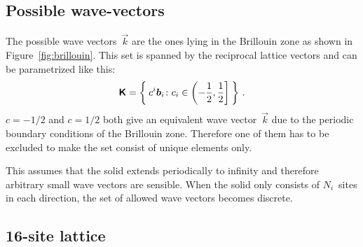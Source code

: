 \documentclass[11pt, english, fleqn, DIV=15, headinclude, BCOR=1cm]{scrartcl}
\begin{document}
\subsection{Possible wave-vectors}

\newcommand{\setK}{\text{\bfseries\sffamily K}}

The possible wave vectors~$\vec k$ are the ones lying in the Brillouin zone as
shown in Figure~\ref{fig:brillouin}. This set is spanned by the reciprocal
lattice vectors and can be parametrized like this:
\[
    \setK = \Set{c^i \vec b_i \colon c_i \in \left(- \frac12 , \frac12 \right]}
    \,.
\]
$c = - 1/2$ and $c = 1/2$ both give an equivalent wave vector~$\vec k$ due to
the periodic boundary conditions of the Brillouin zone. Therefore one of them
has to be excluded to make the set consist of unique elements only.

This assumes that the solid extends periodically to infinity and therefore
arbitrary small wave vectors are sensible. When the solid only consists of
$N_i$~sites in each direction, the set of allowed wave vectors becomes
discrete.

\subsection{16-site lattice}
\end{document}
